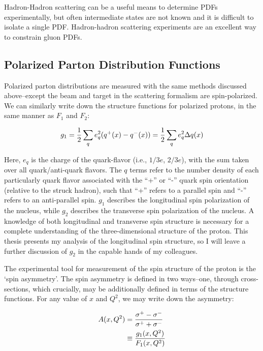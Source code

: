 Hadron-Hadron scattering can be a useful means to determine PDFs experimentally,
but often intermediate states are not known and it is difficult to isolate a
single PDF. Hadron-hadron scattering experiments are an excellent way to
constrain gluon PDFs.

\subsection{Polarized Parton Distribution Functions}
\label{sec:polarized_parton_distribution_functions}

Polarized parton distributions are measured with the same methods discussed
above--except the beam and target in the scattering formalism are
spin-polarized. We can similarly write down the structure functions for
polarized protons, in the same manner as $F_1$ and $F_2$:

\begin{equation}
  g_1 = {1 \over 2}\sum_q e_q^2(q^+(x)-q^-(x)) 
  = {1 \over 2} \sum_q e^2_q\Delta q(x)
  \label{eq:g1}
\end{equation}

Here, $e_q$ is the charge of the quark-flavor (i.e., $1/3e$, $2/3e$), with the
sum taken over all quark/anti-quark flavors. The $q$ terms refer to the number
density of each particularly quark flavor associated with the ``+'' or ``-'' quark
spin orientation (relative to the struck hadron), such that ``+'' refers to a
parallel spin and ``-'' refers to an anti-parallel spin. $g_1$ describes the
longitudinal spin polarization of the nucleus, while $g_2$ describes the
transverse spin polarization of the nucleus. A knowledge of both longitudinal
and transverse spin structure is necessary for a complete understanding of the
three-dimensional structure of the proton. This thesis presents my analysis of
the longitudinal spin structure, so I will leave a further discussion of $g_2$
in the capable hands of my colleagues.  

The experimental tool for measurement of the spin structure of the proton is the
`spin asymmetry'. The spin asymmetry is defined in two ways--one, through
cross-sections, which crucially, may be additionally defined in terms of the
structure functions. For any value of $x$ and $Q^2$, we may write down the
asymmetry:

\begin{align}
  A(x,Q^2) &= {{\sigma^+-\sigma^-}\over{\sigma^++\sigma^-}} \label{eq:al_simple} \\
           &\equiv {{g_1(x,Q^2)}\over{F_1(x,Q^2)}} \label{eq:al_structure}
\end{align}

